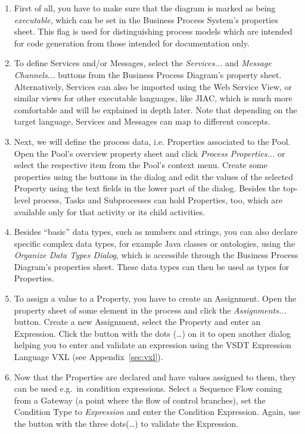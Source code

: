 \begin{enumerate}

	\item First of all, you have to make sure that the diagram is marked as being
	\emph{executable}, which can be set in the Business Process System's properties
	sheet.  This flag is used for distinguishing process models which are intended
	for code generation from those intended for documentation only.

	\item To define Services and/or Messages, select the \emph{Services...} and
	\emph{Message Channels...} buttons from the Business Process Diagram's property
	sheet.  Alternatively, Services can also be imported using the Web Service
	View, or similar views for other executable languages, like JIAC, which is
	much more comfortable and will be explained in depth later.  Note that depending
	on the target language, Services and Messages can map to different concepts.

	\item Next, we will define the process data, i.e. Properties associated to
	the Pool.  Open the Pool's overview property sheet and click \emph{Process
	Properties...} or select the respective item from the Pool's context menu.
	Create some properties using the buttons in the dialog and edit the values of
	the selected Property using the text fields in the lower part of the dialog.
	Besides the top-level process, Tasks and Subprocesses can hold Properties,
	too, which are available only for that activity or its child activities.
	
	\item Besides ``basic'' data types, such as numbers and strings, you can also
	declare specific complex data types, for example Java classes or ontologies,
	using the \emph{Organize Data Types Dialog}, which is accessible through the
	Business Process Diagram's properties sheet.  These data types can then be
	used as types for Properties.
	
	\item To assign a value to a Property, you have to create an Assignment.
	Open the property sheet of some element in the process and click the
	\emph{Assignments...} button.  Create a new Assignment, select the Property
	and enter an Expression.  Click the button with the dots (\dots) on it to
	open another dialog helping you to enter and validate an expression using
	the VSDT Expression Language VXL (see Appendix~\ref{sec:vxl}).
	
	\item Now that the Properties are declared and have values assigned to them,
	they can be used e.g.\ in condition expressions.  Select a Sequence Flow
	coming from a Gateway (a point where the flow of control branches), set the
	Condition Type to \emph{Expression} and enter the Condition Expression.
	Again, use the button with the three dots(\dots) to validate the Expression.
	

\end{enumerate}
